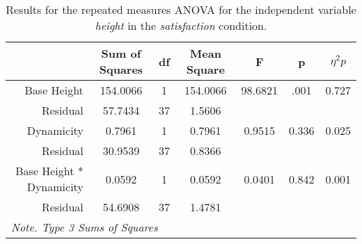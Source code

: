 \begin{table*}[ht]
    \centering
    \caption{Results for the repeated measures ANOVA for the independent variable \textit{height} in the \textit{satisfaction} condition.}
    \begin{tabular}{r|cccccc}
    \toprule
                                  & \textbf{Sum of Squares} & \textbf{df} & \textbf{Mean Square} & \textbf{F} & \textbf{p} & \textbf{$\eta^2p$} \\
    \midrule
    Base Height                   & 154.0066                & 1           & 154.0066             & 98.6821    & .001       & 0.727              \\
    Residual                      & 57.7434                 & 37          & 1.5606               &            &            &                    \\
    Dynamicity                    & 0.7961                  & 1           & 0.7961               & 0.9515     & 0.336      & 0.025              \\
    Residual                      & 30.9539                 & 37          & 0.8366               &            &            &                    \\
    Base Height * Dynamicity      & 0.0592                  & 1           & 0.0592               & 0.0401     & 0.842      & 0.001              \\
    Residual                      & 54.6908                 & 37          & 1.4781               &            &            &                    \\
    \bottomrule
    \multicolumn{7}{l}{\textit{Note. Type 3 Sums of Squares}}                                                                                                                                                                                                  
    \end{tabular}
\end{table*}

